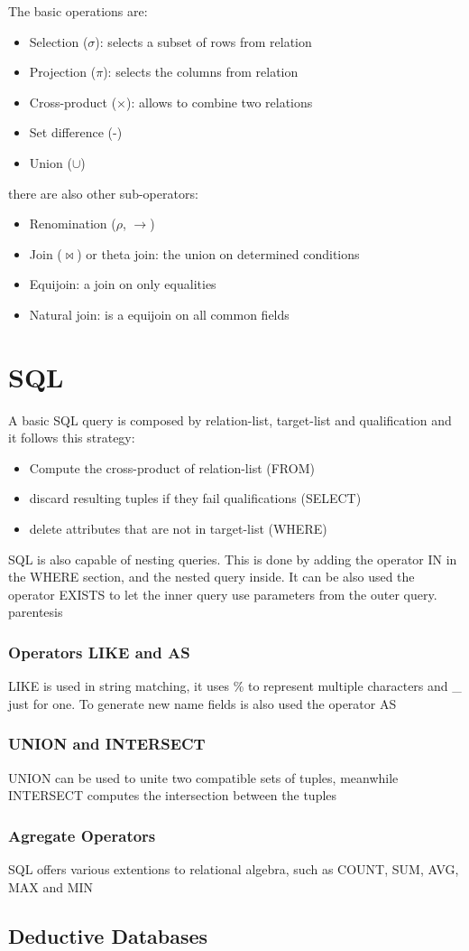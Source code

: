 \documentclass[12pt, a4paper]{article}
\begin{document}
The basic operations are:
\begin{itemize}
    \item Selection ($\sigma$): selects a subset of rows from relation 
    \item Projection ($\pi$): selects the columns from relation
    \item Cross-product ($\times$): allows to combine two relations
    \item Set difference (-) 
    \item Union ($\cup$)
\end{itemize}
there are also other sub-operators:
\begin{itemize}
    \item Renomination ($\rho$, $\rightarrow$)
    \item Join ($\Join$) or theta join: the union on determined conditions
    \item Equijoin: a join on only equalities
    \item Natural join: is a equijoin on all common fields
\end{itemize}

\newpage
\section{SQL}
A basic SQL query is composed by relation-list, target-list and qualification and it follows this strategy:
\begin{itemize}
    \item Compute the cross-product of relation-list (FROM)
    \item discard resulting tuples if they fail qualifications (SELECT)
    \item delete attributes that are not in target-list (WHERE)
\end{itemize}
SQL is also capable of nesting queries. This is done by adding the operator IN in the WHERE section, and the nested query inside.
It can be also used the operator EXISTS to let the inner query use parameters from the outer query.
parentesis

\subsubsection{Operators LIKE and AS}
LIKE is used in string matching, it uses \% to represent multiple characters and \_ just for one. To generate new name fields
is also used the operator AS

\subsubsection{UNION and INTERSECT} 
UNION can be used to unite two compatible sets of tuples, meanwhile INTERSECT computes the intersection between the tuples

\subsubsection{Agregate Operators}
SQL offers various extentions to relational algebra, such as COUNT, SUM, AVG, MAX and MIN

\subsection{Deductive Databases}
\end{document}

